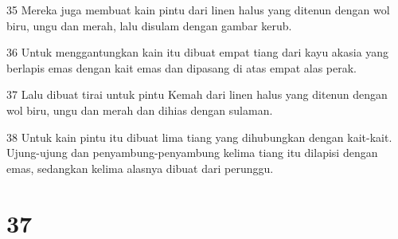 \par 35 Mereka juga membuat kain pintu dari linen halus yang ditenun dengan wol biru, ungu dan merah, lalu disulam dengan gambar kerub.
\par 36 Untuk menggantungkan kain itu dibuat empat tiang dari kayu akasia yang berlapis emas dengan kait emas dan dipasang di atas empat alas perak.
\par 37 Lalu dibuat tirai untuk pintu Kemah dari linen halus yang ditenun dengan wol biru, ungu dan merah dan dihias dengan sulaman.
\par 38 Untuk kain pintu itu dibuat lima tiang yang dihubungkan dengan kait-kait. Ujung-ujung dan penyambung-penyambung kelima tiang itu dilapisi dengan emas, sedangkan kelima alasnya dibuat dari perunggu.

\chapter{37}

